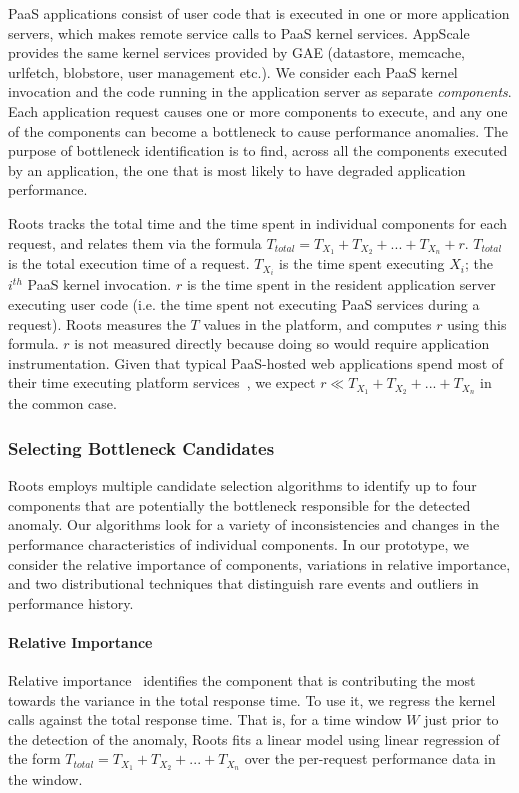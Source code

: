 PaaS applications 
consist of user code that is executed in one or more application servers,
which makes remote service calls to PaaS kernel services. 
AppScale provides the same kernel services provided by GAE (datastore, memcache,
urlfetch, blobstore, user management etc.).
We consider each PaaS kernel invocation and the code running in the application server as 
separate \textit{components}. Each application request causes one or more components to
execute, and any one of the components can become a bottleneck to cause performance anomalies.  
The purpose of bottleneck identification is to find, across all
the components executed by an application, the one that is most likely to have 
degraded application performance.

Roots tracks the total time and the time spent in individual components for each request, 
and relates them via the formula $T_{total} = T_{X_1} + T_{X_2} + ... + T_{X_n} + r$. 
$T_{total}$ is the total execution time of a request. $T_{X_i}$ is the time spent executing
$X_i$; the $i^{th}$ PaaS kernel invocation.  $r$ is the time spent in the resident
application server executing user code (i.e. the time
spent not executing PaaS services during a request). Roots measures the $T$ values in the platform, and
computes $r$ using this formula. $r$ is not measured directly because doing so would require 
application instrumentation. Given that typical PaaS-hosted web
applications spend most of their time executing platform 
services~\cite{Jayathilaka:2015:RTS:2806777.2806842},
we expect $r \ll T_{X_1} + T_{X_2} + ... + T_{X_n}$ in the common case.

\subsubsection{Selecting Bottleneck Candidates}

Roots employs multiple candidate selection algorithms to identify up to four 
components that are potentially
the bottleneck responsible for the detected anomaly. Our algorithms look for
a variety of inconsistencies and changes in the performance characteristics of 
individual components.  In our prototype, we consider the relative importance of components, 
variations in relative importance, and two 
distributional techniques that distinguish rare events and 
outliers in performance history.

\paragraph*{Relative Importance}
Relative importance~\cite{JSSv017i01} identifies the component that is contributing 
the most towards the variance in the total response time. 
To use it, we regress the kernel calls against the total response time.
That is, for a time window $W$ just prior to the detection of the anomaly, Roots
fits a linear model using linear regression of the form
$T_{total} = T_{X_1} + T_{X_2} + ... + T_{X_n}$
over the per-request performance data in the window.


